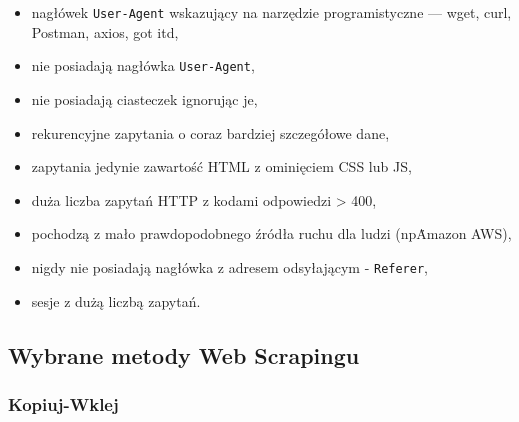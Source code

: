 \begin{itemize}
    \item nagłówek \texttt{User-Agent} wskazujący na narzędzie programistyczne --- wget, curl, Postman, axios, got itd,
    \item nie posiadają nagłówka \texttt{User-Agent},
    \item nie posiadają ciasteczek ignorując je,
    \item rekurencyjne zapytania o coraz bardziej szczegółowe dane,
    \item zapytania jedynie zawartość HTML z ominięciem CSS lub JS,
    \item duża liczba zapytań HTTP z kodami odpowiedzi > 400,
    \item pochodzą z mało prawdopodobnego źródła ruchu dla ludzi (np\. Amazon AWS),
    \item nigdy nie posiadają nagłówka z adresem odsyłającym - \texttt{Referer},
    \item sesje z dużą liczbą zapytań\cite{bot-buster}.
\end{itemize}

\subsection{Wybrane metody Web Scrapingu}\label{subsec:web-scraping-methods}

\subsubsection{Kopiuj-Wklej}

